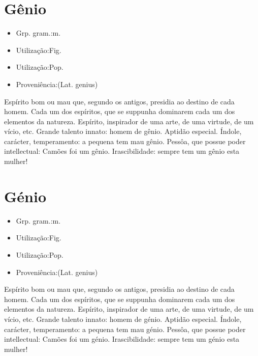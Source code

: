 \section{Gênio}
\begin{itemize}
\item {Grp. gram.:m.}
\end{itemize}
\begin{itemize}
\item {Utilização:Fig.}
\end{itemize}
\begin{itemize}
\item {Utilização:Pop.}
\end{itemize}
\begin{itemize}
\item {Proveniência:(Lat. \textunderscore genius\textunderscore )}
\end{itemize}
Espírito bom ou mau que, segundo os antigos, presidia ao destino de cada homem.
Cada um dos espíritos, que se suppunha dominarem cada um dos elementos da natureza.
Espírito, inspirador de uma arte, de uma virtude, de um vício, etc.
Grande talento innato: \textunderscore homem de gênio\textunderscore .
Aptidão especial.
Índole, carácter, temperamento: \textunderscore a pequena tem mau gênio\textunderscore .
Pessôa, que possue poder intellectual: \textunderscore Camões foi um gênio\textunderscore .
Irascibilidade: \textunderscore sempre tem um gênio esta mulher!\textunderscore 
\section{Génio}
\begin{itemize}
\item {Grp. gram.:m.}
\end{itemize}
\begin{itemize}
\item {Utilização:Fig.}
\end{itemize}
\begin{itemize}
\item {Utilização:Pop.}
\end{itemize}
\begin{itemize}
\item {Proveniência:(Lat. \textunderscore genius\textunderscore )}
\end{itemize}
Espírito bom ou mau que, segundo os antigos, presidia ao destino de cada homem.
Cada um dos espíritos, que se suppunha dominarem cada um dos elementos da natureza.
Espírito, inspirador de uma arte, de uma virtude, de um vício, etc.
Grande talento innato: \textunderscore homem de génio\textunderscore .
Aptidão especial.
Índole, carácter, temperamento: \textunderscore a pequena tem mau génio\textunderscore .
Pessôa, que possue poder intellectual: \textunderscore Camões foi um génio\textunderscore .
Irascibilidade: \textunderscore sempre tem um génio esta mulher!\textunderscore 
